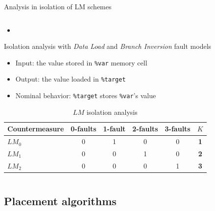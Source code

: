 \begin{frame}[fragile]{Analysis in isolation of LM schemes}
\begin{columns}
\begin{small}
\begin{column}{0.65\textwidth}
                \begin{itemize}
                    \item []
                \end{itemize}
                
                Isolation analysis with \textit{Data Load} and \textit{Branch Inversion} fault models
                \vspace{0.2cm}
                
                \begin{itemize}
                    \item Input: the value stored in \texttt{\%var} memory cell
                    \item Output: the value loaded in \texttt{\%target}
                    \item Nominal behavior: \texttt{\%target} stores \texttt{\%var}'s value
                \end{itemize}
                
                \begin{table}[ht]
                    \begin{tiny}
                        \begin{center}
                            \setlength\tabcolsep{2.1pt}
                            \begin{tabular}{l|ccccc}
                                Countermeasure & 0-faults & 1-fault & 2-faults & 3-faults &  \textbf{$K$} \\
                                \hline
                                $LM_0$ & 0 & 1 & 0 & 0 &  \textbf{1}\\
                                $LM_1$ & 0 & 0 & 1 & 0 &  \textbf{2} \\
                                $LM_2$ & 0 & 0 & 0 & 1 &  \textbf{3}
                            \end{tabular}
                        \end{center} 
                    \end{tiny}
                    \caption{$LM$ isolation analysis}
                \end{table}
            \end{column}
        \end{small}
    \end{columns}
\end{frame}

\subsection{Placement algorithms}

